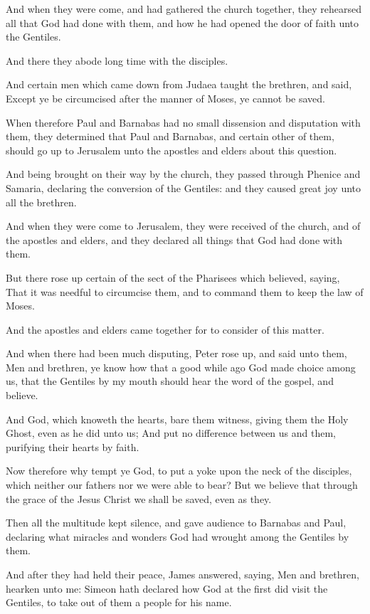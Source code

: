 \Verse And when they were come, and had gathered the church together, they rehearsed all that God had done with them, and how he had opened the door of faith unto the Gentiles.

\Verse And there they abode long time with the disciples.


\Chapter
\Verse And certain men which came down from Judaea taught the brethren, and said, Except ye be circumcised after the manner of Moses, ye cannot be saved.

\Verse When therefore Paul and Barnabas had no small dissension and disputation with them, they determined that Paul and Barnabas, and certain other of them, should go up to Jerusalem unto the apostles and elders about this question.

\Verse And being brought on their way by the church, they passed through Phenice and Samaria, declaring the conversion of the Gentiles: and they caused great joy unto all the brethren.

\Verse And when they were come to Jerusalem, they were received of the church, and of the apostles and elders, and they declared all things that God had done with them.

\Verse But there rose up certain of the sect of the Pharisees which believed, saying, That it was needful to circumcise them, and to command them to keep the law of Moses.

\Verse And the apostles and elders came together for to consider of this matter.

\Verse And when there had been much disputing, Peter rose up, and said unto them, Men and brethren, ye know how that a good while ago God made choice among us, that the Gentiles by my mouth should hear the word of the gospel, and believe.

\Verse And God, which knoweth the hearts, bare them witness, giving them the Holy Ghost, even as he did unto us; \Verse And put no difference between us and them, purifying their hearts by faith.

\Verse Now therefore why tempt ye God, to put a yoke upon the neck of the disciples, which neither our fathers nor we were able to bear?  \Verse But we believe that through the grace of the \LORD Jesus Christ we shall be saved, even as they.

\Verse Then all the multitude kept silence, and gave audience to Barnabas and Paul, declaring what miracles and wonders God had wrought among the Gentiles by them.

\Verse And after they had held their peace, James answered, saying, Men and brethren, hearken unto me: \Verse Simeon hath declared how God at the first did visit the Gentiles, to take out of them a people for his name.

